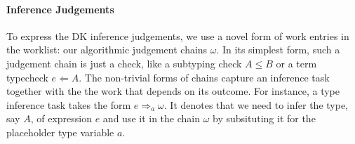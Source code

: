 \paragraph{Inference Judgements}
To express the DK inference judgements, we use a novel form of work entries in
the worklist: our algorithmic judgement chains $\omega$. In its simplest form,
such a judgement chain is just a check, like a subtyping check $A \leq B$ or a
term typecheck $e \Leftarrow A$.  The non-trivial forms of chains capture an
inference task together with the the work that depends on its outcome. For
instance, a type inference task takes the form $e \Rightarrow_a \omega$. It
denotes that we need to infer the type, say $A$, of expression $e$ and use it
in the chain $\omega$ by subsituting it for the placeholder type variable $a$.




